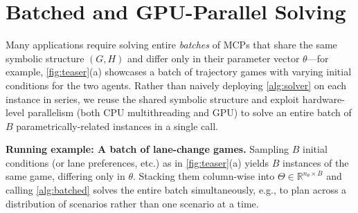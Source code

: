 \documentclass[conference]{IEEEtran}
\newcommand{\contentbox}[2]{
  \begin{mdframed}[backgroundcolor=black!5,linecolor=black!60,linewidth=0.5mm]
    \vspace{0.2mm}
    {\bf Running example: #1.} #2
  \end{mdframed}
}
\begin{document}
\begin{algorithm}[t]
\DontPrintSemicolon
{}
\caption{Primal-dual interior point method for \cref{eq:primal-dual-mcp}}
\label{alg:solver}
\end{algorithm}

\section{Batched and GPU-Parallel Solving}
\label{sec:batched}

Many applications require solving entire \emph{batches} of MCPs that share
the same symbolic structure $(G, H)$ and differ only in their parameter vector
$\theta$---for example,
\cref{fig:teaser}(a) showcases a batch of trajectory games with varying initial
conditions for the two agents. Rather than naively deploying
\cref{alg:solver} on each instance in series, we reuse the shared symbolic
structure and exploit hardware-level parallelism (both CPU multithreading and
GPU) to solve an entire batch of $B$ parametrically-related instances in a single call.

\contentbox{A batch of lane-change games}{
  Sampling $B$ initial conditions (or lane preferences, etc.)
  as in
  \cref{fig:teaser}(a) yields $B$ instances of the same game, differing only
  in $\theta$. Stacking them column-wise into $\Theta \in \mathbb{R}^{n_\theta \times
    B}$ and calling \cref{alg:batched} solves the entire batch simultaneously,
  e.g., to plan across a distribution of scenarios
  \cite{li2023scenario} rather than one scenario at a time.
}
\end{document}
